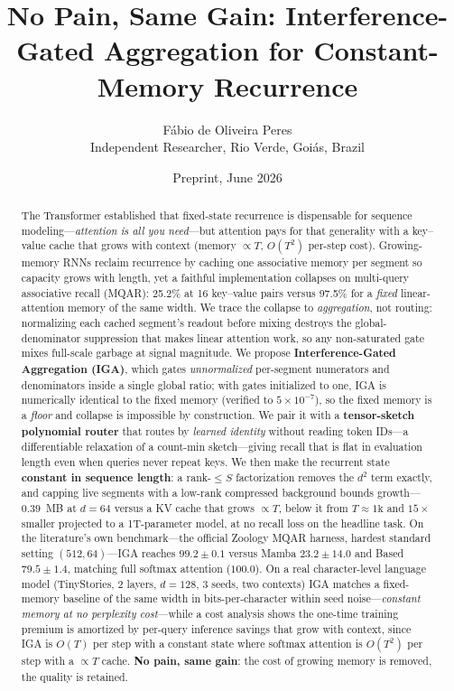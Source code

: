 \documentclass[11pt]{article}
\title{No Pain, Same Gain: Interference-Gated Aggregation for
       Constant-Memory Recurrence}
\author{F\'abio de Oliveira Peres\\
        \small Independent Researcher, Rio Verde, Goi\'as, Brazil}
\date{Preprint, June 2026}
\begin{document}
\maketitle

\begin{abstract}
The Transformer established that fixed-state recurrence is dispensable for
sequence modeling---\emph{attention is all you need}---but attention pays for
that generality with a key--value cache that grows with context
(memory $\propto T$, $O(T^2)$ per-step cost). Growing-memory RNNs
\citep{behrouz2026memorycaching} reclaim recurrence by caching one associative
memory per segment so capacity grows with length, yet a faithful implementation
collapses on multi-query associative recall (MQAR): 25.2\% at 16 key--value pairs
versus 97.5\% for a \emph{fixed} linear-attention memory of the same width. We
trace the collapse to \emph{aggregation}, not routing: normalizing each cached
segment's readout before mixing destroys the global-denominator suppression that
makes linear attention work, so any non-saturated gate mixes full-scale garbage
at signal magnitude. We propose \textbf{Interference-Gated Aggregation (IGA)},
which gates \emph{unnormalized} per-segment numerators and denominators inside a
single global ratio; with gates initialized to one, IGA is numerically identical
to the fixed memory (verified to $5\times10^{-7}$), so the fixed memory is a
\emph{floor} and collapse is impossible by construction. We pair it with a
\textbf{tensor-sketch polynomial router} that routes by \emph{learned identity}
without reading token IDs---a differentiable relaxation of a count-min
sketch---giving recall that is flat in evaluation length even when queries never
repeat keys. We then make the recurrent state \textbf{constant in sequence
length}: a rank-$\le S$ factorization removes the $d^2$ term exactly, and capping
live segments with a low-rank compressed background bounds growth---$0.39$~MB at
$d=64$ versus a KV cache that grows $\propto T$, below it from
$T\!\approx\!1\mathrm{k}$ and $15\times$ smaller projected to a 1T-parameter model,
at no recall loss on the headline task. On the literature's own benchmark---the
official Zoology MQAR harness, hardest standard setting $(512,64)$---IGA reaches
$99.2\pm0.1$ versus Mamba $23.2\pm14.0$ and Based $79.5\pm1.4$, matching full
softmax attention ($100.0$). On a real character-level language model
(TinyStories, 2 layers, $d=128$, 3 seeds, two contexts) IGA matches a fixed-memory
baseline of the same width in bits-per-character within seed noise---\emph{constant
memory at no perplexity cost}---while a cost analysis shows the one-time training
premium is amortized by per-query inference savings that grow with context, since
IGA is $O(T)$ per step with a constant state where softmax attention is $O(T^2)$
per step with a $\propto T$ cache. \textbf{No pain, same gain}: the cost of
growing memory is removed, the quality is retained.
\end{abstract}
\end{document}
